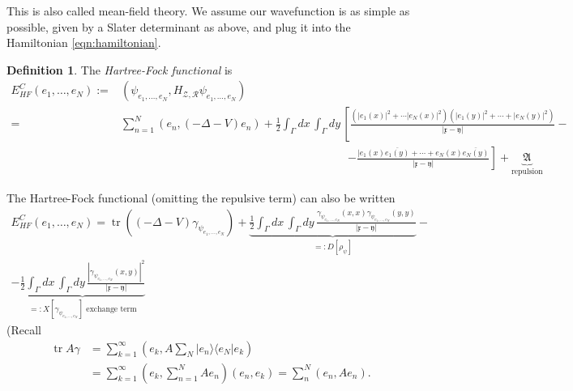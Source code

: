 \documentclass[11pt]{amsart}
\newcommand{\vocab}[1]{\emph{#1}}
\theoremstyle{definition}
\theoremstyle{definition}
\newtheorem{defn}{Definition}
\theoremstyle{definition}
\numberwithin{equation}{section}
\begin{document}
This is also called mean-field theory. We assume our wavefunction is as simple as possible, given by a Slater determinant as above, and plug it into the Hamiltonian \eqref{eqn:hamiltonian}.
\begin{defn}
The \vocab{Hartree-Fock functional} is
\begin{align*}
E_{HF}^C(e_1,\ldots,e_N):=&(\psi_{e_1,\ldots,e_N},H_{\mathcal{Z},\mathcal{R}}\psi_{e_1,\ldots,e_N})\\
=&\sum_{n=1}^N(e_n,(-\Delta-V)e_n)+\frac{1}{2}\int_\Gamma dx\,\int_\Gamma dy\,\left[\frac{(|e_1(x)|^2+\cdots|e_N(x)|^2)(|e_1(y)|^2+\cdots+|e_N(y)|^2)}{|\mathfrak{x}-\mathfrak{y}|}-\right.\\
&\qquad\qquad\qquad\qquad\qquad\qquad\qquad\qquad\qquad\qquad\left.-\frac{|e_1(x)\overline{e_1(y)}+\cdots+e_N(x)\overline{e_N(y)}}{|\mathfrak{x}-\mathfrak{y}|}\right] +\underbrace{\mathfrak{A}}_{\text{repulsion}}
\end{align*}
\end{defn}
The Hartree-Fock functional (omitting the repulsive term) can also be written
\begin{multline}
E_{HF}^C(e_1,\ldots,e_N)=\operatorname{tr}((-\Delta-V)\gamma_{\psi_{e_1,\ldots,e_N}})+\underbrace{\frac{1}{2}\int_\Gamma dx\,\int_\Gamma dy\,\frac{\gamma_{\psi_{e_1,\ldots,e_N}}(x,x)\gamma_{\psi_{e_1,\ldots,e_N}}(y,y)}{|\mathfrak{x}-\mathfrak{y}|}}_{=:D[\rho_\psi]}-\\
-\underbrace{\frac{1}{2}\int_\Gamma dx\,\int_\Gamma dy\,\frac{|\gamma_{\psi_{e_1,\ldots,e_N}}(x,y)|^2}{|\mathfrak{x}-\mathfrak{y}|}}_{=:X[\gamma_{\psi_{e_1,\ldots,e_N}}]\text{ exchange term}}
\end{multline}
(Recall
\begin{align*}
\operatorname{tr}A\gamma&=\sum_{k=1}^\infty (e_k,A\sum_N|e_n\rangle\langle e_N|e_k)\\
&=\sum_{k=1}^\infty(e_k,\sum_{n=1}^NAe_n)(e_n,e_k)=\sum_n^N(e_n,Ae_n).
\end{align*}
\end{document}
